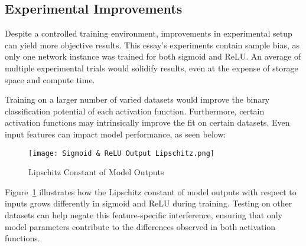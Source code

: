 \documentclass{article}
\theoremstyle{definition}
\begin{document}

\subsection{Experimental Improvements}

Despite a controlled training environment, improvements in experimental setup can yield more objective results. This essay's experiments contain sample bias, as only one network instance was trained for both sigmoid and ReLU. An average of multiple experimental trials would solidify results, even at the expense of storage space and compute time. 

Training on a larger number of varied datasets would improve the binary classification potential of each activation function. Furthermore, certain activation functions may intrinsically improve the fit on certain datasets. Even input features can impact model performance, as seen below:

\begin{figure}[H]
    \centering
    \texttt{[image: Sigmoid \& ReLU Output Lipschitz.png]} %
    \caption{Lipschitz Constant of Model Outputs}
    \label{fig:Figure 11}
\end{figure}

Figure~\ref{fig:Figure 11} illustrates how the Lipschitz constant of model outputs with respect to inputs grows differently in sigmoid and ReLU during training. Testing on other datasets can help negate this feature-specific interference, ensuring that only model parameters contribute to the differences observed in both activation functions. 

\end{document}
